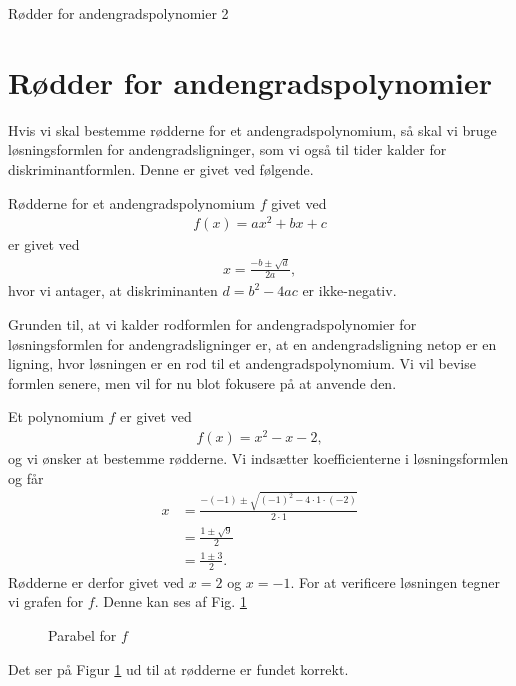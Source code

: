 
\begin{center}
\Huge
Rødder for andengradspolynomier 2
\end{center}

\section*{Rødder for andengradspolynomier}

Hvis vi skal bestemme rødderne for et andengradspolynomium, så skal vi bruge løsningsformlen for andengradsligninger, som vi også til tider kalder for diskriminantformlen. Denne er givet ved følgende. 
\begin{setn}
	Rødderne for et andengradspolynomium $f$ givet ved
	\begin{align*}
		f(x) = ax^2+bx+c
	\end{align*}
	er givet ved
	\begin{align*}
		x = \frac{-b \pm \sqrt{d}}{2a},
	\end{align*}
	hvor vi antager, at diskriminanten $d = b^2 - 4ac$ er ikke-negativ.
\end{setn}
Grunden til, at vi kalder rodformlen for andengradspolynomier for løsningsformlen for andengradsligninger er, at en andengradsligning netop er en ligning, hvor løsningen er en rod til et andengradspolynomium. Vi vil bevise formlen senere, men vil for nu blot fokusere på at anvende den. 
\begin{exa}
	Et polynomium $f$ er givet ved
	\begin{align*}
		f(x) = x^2 - x - 2,
	\end{align*}
	og vi ønsker at bestemme rødderne. Vi indsætter koefficienterne i løsningsformlen og får
	\begin{align*}
		x &= \frac{-(-1) \pm \sqrt{(-1)^2-4\cdot 1 \cdot (-2)}}{2\cdot 1}\\
		&= \frac{1\pm \sqrt{9}}{2}\\
		&= \frac{1\pm 3}{2}.
	\end{align*}
	Rødderne er derfor givet ved $x = 2$ og $x = -1$. For at verificere løsningen tegner vi grafen for $f$. Denne kan ses af Fig. \ref{fig:rødder}
	\begin{figure}[H]
		\centering
		\caption{Parabel for $f$}
		\label{fig:rødder}
	\end{figure}
	Det ser på Figur \ref{fig:rødder} ud til at rødderne er fundet korrekt.
\end{exa}
